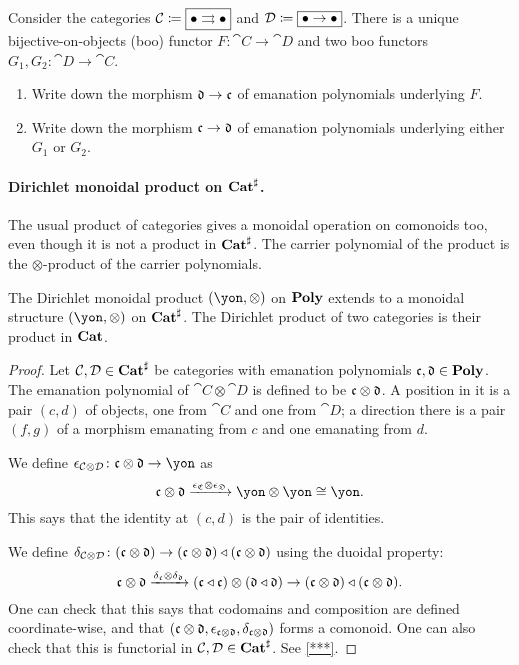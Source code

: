 \documentclass[DynamicalBook]{subfiles}
\begin{document}
\begin{exercise}
Consider the categories $\mathcal{C}\coloneqq\fbox{$\bullet\rightrightarrows\bullet$}$ and $\mathcal{D}\coloneqq\fbox{$\bullet\to\bullet$}$. There is a unique bijective-on-objects (boo) functor $F\colon\cat{C}\to\cat{D}$ and two boo functors $G_1,G_2\colon\cat{D}\to\cat{C}$.
\begin{enumerate}
	\item Write down the morphism $\mathfrak{d}\to\mathfrak{c}$ of emanation polynomials underlying $F$.
	\item Write down the morphism $\mathfrak{c}\to\mathfrak{d}$ of emanation polynomials underlying either $G_1$ or $G_2$.
\qedhere
\end{enumerate}
\end{exercise}

\paragraph{Dirichlet monoidal product on $\textbf{Cat}^\sharp$.}

The usual product of categories gives a monoidal operation on comonoids too, even though it is not a product in $\textbf{Cat}^\sharp$. The carrier polynomial of the product is the $\otimes$-product of the carrier polynomials.


\begin{proposition}\label{prop.dirichlet_on_catsharp}
The Dirichlet monoidal product $(\yon,\otimes)$ on $\textbf{Poly}$ extends to a monoidal structure $(\yon,\otimes)$ on $\textbf{Cat}^\sharp$. The Dirichlet product of two categories is their product in $\textbf{Cat}$.
\end{proposition}
\begin{proof}
Let $\mathcal{C},\mathcal{D}\in\textbf{Cat}^\sharp$ be categories with emanation polynomials $\mathfrak{c},\mathfrak{d}\in\textbf{Poly}$. The emanation polynomial of $\cat{C}\otimes\cat{D}$ is defined to be $\mathfrak{c}\otimes\mathfrak{d}$. A position in it is a pair $(c,d)$ of objects, one from $\cat{C}$ and one from $\cat{D}$; a direction there is a pair $(f,g)$ of a morphism emanating from $c$ and one emanating from $d$. 

We define $\epsilon_{\cat{C}\otimes\cat{D}}\colon\ema{c}\otimes\ema{d}\to\yon$ as
\[
\ema{c}\otimes\ema{d}\To{\epsilon_{\ema{C}}\otimes\epsilon_{\ema{D}}}\yon\otimes\yon\cong\yon.
\]
This says that the identity at $(c,d)$ is the pair of identities.

We define $\delta_{\mathcal{C}\otimes\mathcal{D}}\colon(\mathfrak{c}\otimes\mathfrak{d})\to(\mathfrak{c}\otimes\mathfrak{d})\mathbin{\triangleleft}(\mathfrak{c}\otimes\mathfrak{d})$ using the duoidal property:
\[
\mathfrak{c}\otimes\mathfrak{d}\xrightarrow{\delta_{\mathfrak{c}}\otimes\delta_{\mathfrak{d}}}(\mathfrak{c}\mathbin{\triangleleft}\mathfrak{c})\otimes(\mathfrak{d}\mathbin{\triangleleft}\mathfrak{d})\to(\mathfrak{c}\otimes\mathfrak{d})\mathbin{\triangleleft}(\mathfrak{c}\otimes\mathfrak{d}).
\]
One can check that this says that codomains and composition are defined coordinate-wise, and that $(\mathfrak{c}\otimes\mathfrak{d},\epsilon_{\mathfrak{c}\otimes\mathfrak{d}},\delta_{\mathfrak{c}\otimes\mathfrak{d}})$ forms a comonoid. One can also check that this is functorial in $\mathcal{C},\mathcal{D}\in\textbf{Cat}^\sharp$. See \cref{***}.
\end{proof}
\end{document}
